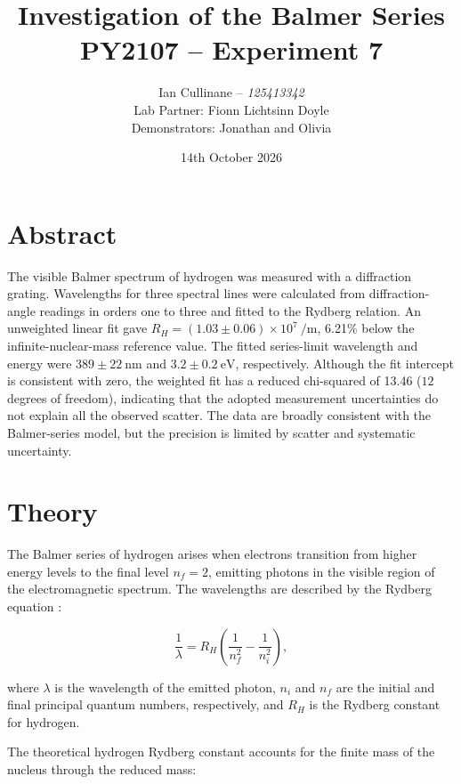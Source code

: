 \documentclass[12pt,a4paper]{article}
\title{
    \Large\textbf{Investigation of the Balmer Series}\\[0.5em]
    \large PY2107 -- Experiment 7
}
\author{
    Ian Cullinane -- \textit{125413342}\\[0.5em]
    Lab Partner: Fionn Lichtsinn Doyle\\[0.5em]
    Demonstrators: Jonathan and Olivia
}
\date{14th October 2026}
\begin{document}
\maketitle
\thispagestyle{empty}

\newpage
\tableofcontents
\newpage

\section{Abstract}

The visible Balmer spectrum of hydrogen was measured with a
diffraction grating. Wavelengths for three spectral lines were
calculated from diffraction-angle readings in orders one to three
and fitted to the Rydberg relation. An unweighted linear fit gave
$R_H=(1.03\pm0.06)\times10^7\ \si{\per\metre}$, 6.21\% below
the infinite-nuclear-mass reference value. The fitted series-limit
wavelength and energy were $389\pm22\ \si{\nano\metre}$ and
$3.2\pm0.2\ \si{\electronvolt}$, respectively. Although the
fit intercept is consistent with zero, the weighted fit has a
reduced chi-squared of 13.46 ($12$ degrees of freedom), indicating
that the adopted measurement uncertainties do not explain all the
observed scatter. The data are broadly consistent with the
Balmer-series model, but the precision is limited by scatter and
systematic uncertainty.

\newpage

\section{Theory}


The Balmer series of hydrogen arises when electrons transition
from higher energy levels to the final level $n_f=2$, emitting
photons in the visible region of the electromagnetic spectrum.
The wavelengths are described by the Rydberg equation
\cite{py2107,nistRydberg}:

\[
\frac{1}{\lambda}
= R_H \left(\frac{1}{n_f^2}-\frac{1}{n_i^2}\right),
\]

where $\lambda$ is the wavelength of the emitted photon,
$n_i$ and $n_f$ are the initial and final principal quantum
numbers, respectively, and $R_H$ is the Rydberg constant
for hydrogen.

The theoretical hydrogen Rydberg constant accounts for the
finite mass of the nucleus through the reduced mass:
\end{document}

